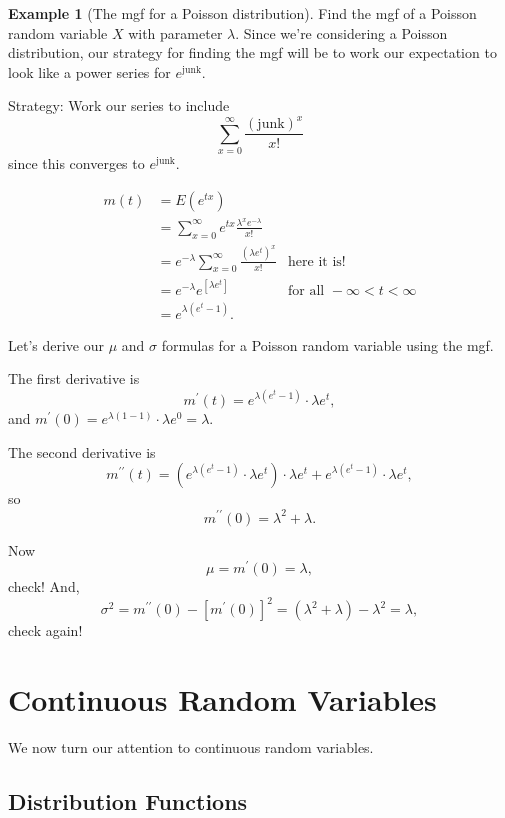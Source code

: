\documentclass[
]{book}
\theoremstyle{definition}
\theoremstyle{definition}
\newtheorem{example}{Example}[chapter]
\theoremstyle{definition}
\theoremstyle{definition}
\theoremstyle{remark}
\begin{document}
\begin{example}[The mgf for a Poisson distribution]
\protect\hypertarget{exm:mgf-poisson}{}\label{exm:mgf-poisson}Find the mgf of a Poisson random variable \(X\) with parameter \(\lambda\). Since we're considering a Poisson distribution, our strategy for finding the mgf will be to work our expectation to look like a power series for \(e^{\text{junk}}\).

Strategy: Work our series to include \[\sum_{x=0}^\infty\frac{(\text{junk})^x}{x!}\] since this converges to \(e^{\text{junk}}\).

\begin{align*}
m(t) &= E(e^{tx})\\
  &= \sum_{x = 0}^\infty e^{tx}\frac{\lambda^x e^{-\lambda}}{x!}\\
  &= e^{-\lambda} \sum_{x=0}^\infty \frac{(\lambda e^t)^x}{x!} &\text{here it is!}\\
  &= e^{-\lambda}e^{[\lambda e^t]} &\text{for all } -\infty < t < \infty\\
  &= e^{\lambda(e^t-1)}.
\end{align*}

Let's derive our \(\mu\) and \(\sigma\) formulas for a Poisson random variable using the mgf.

The first derivative is
\[m^\prime(t) = e^{\lambda(e^t-1)} \cdot \lambda e^t,\]
and \(m^\prime(0) = e^{\lambda(1-1)}\cdot \lambda e^0 = \lambda.\)

The second derivative is
\[m^{\prime\prime}(t) = (e^{\lambda(e^t-1)} \cdot \lambda e^t) \cdot \lambda e^t + e^{\lambda(e^t-1)} \cdot \lambda e^t,\]
so \[m^{\prime\prime}(0) = \lambda^2 + \lambda.\]

Now \[\mu = m^\prime(0) = \lambda,\] check! And, \[\sigma^2 = m^{\prime\prime}(0) - [m^\prime(0)]^2 = (\lambda^2 + \lambda) - \lambda^2 = \lambda,\]
check again!
\end{example}

\chapter{Continuous Random Variables}\label{continuous-rv}

We now turn our attention to continuous random variables.

\section{Distribution Functions}\label{distribution-functions}
\end{document}
